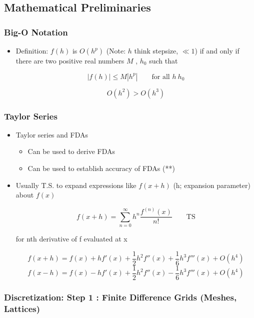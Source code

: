 \subsection{Mathematical Preliminaries}

\subsubsection{Big-O Notation}

\begin{itemize}
    \item Definition: $f(h)$ is $O(h^p)$ (Note: $h$ think stepsize, $\ll 1$) if and only if there are two positive real numbers $M$ , $h_0$ such that 

    \[ |f(h)| \leq M|h^p| \qquad \text{for all } h\ h_0\]

    \[ O(h^2) > O(h^3)\]
\end{itemize}

\subsubsection{Taylor Series}

\begin{itemize}
    \item Taylor series and FDAs
    \begin{itemize}
        \item Can be used to derive FDAs
        \item Can be used to establish accuracy of FDAs (**)
    \end{itemize}
    \item Usually T.S. to expand expressions like $f(x+h)$ (h; expansion parameter) about $f(x)$

    \[ f(x+h) = \sum_{n=0}^\infty h^n \frac{f^{(n)}(x)}{n!} \qquad \text{TS}\]

    for nth derivative of f evaluated at x

    \[ f(x+h) = f(x) + hf'(x) + \frac{1}{2} h^2 f''(x) + \frac{1}{6} h^3 f'''(x) + O(h^4)\]
    \[ f(x-h) = f(x) - hf'(x) + \frac{1}{2} h^2 f''(x) - \frac{1}{6} h^3 f'''(x) + O(h^4)\]    
\end{itemize}

\subsubsection{Discretization: Step 1 : Finite Difference Grids (Meshes, Lattices)}

